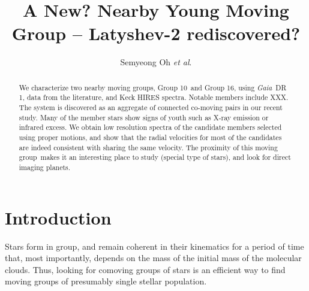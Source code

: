 \documentclass[modern,letterpaper]{aastex61}
\newcommand{\project}[1]{\textsl{#1}}
\newcommand{\gaia}{\project{Gaia}}
\newcommand{\etal}{\textit{et al}.}
\newcommand{\objname}{moving group}
\newcommand{\groupTen}{Group 10}
\newcommand{\groupSixteen}{Group 16}
\begin{document}
\sloppy\sloppypar\raggedbottom\frenchspacing %

\title{A New? Nearby Young Moving Group -- Latyshev-2 rediscovered?}

\author{Semyeong Oh \etal}




\begin{abstract}
  We characterize two nearby moving groups, \groupTen\ and \groupSixteen,
  using \gaia\ DR 1, data from the literature, and Keck HIRES spectra.
  Notable members include XXX.
  The system is discovered as an aggregate of connected co-moving pairs in our recent study.
  Many of the member stars show signs of youth such as X-ray emission or infrared excess.
  We obtain low resolution spectra of the candidate members selected using proper motions, and
  show that the radial velocities for most of the candidates are indeed consistent
  with sharing the same velocity.
  The proximity of this \objname\  makes it an interesting place to study (special type of stars),
  and look for direct imaging planets.
\end{abstract}

\section{Introduction} %
\label{sec:introduction}

Stars form in group, and remain coherent in their kinematics for a period of
time that, most importantly, depends on the mass of the initial mass of the
molecular clouds. Thus, looking for comoving groups of stars is an efficient
way to find moving groups of presumably single stellar population.
\end{document}
